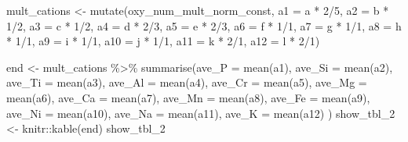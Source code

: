 \documentclass[
]{article}
\newenvironment{Shaded}{\begin{snugshade}}{\end{snugshade}}
\newcommand{\AttributeTok}[1]{\textcolor[rgb]{0.77,0.63,0.00}{#1}}
\newcommand{\DecValTok}[1]{\textcolor[rgb]{0.00,0.00,0.81}{#1}}
\newcommand{\FunctionTok}[1]{\textcolor[rgb]{0.00,0.00,0.00}{#1}}
\newcommand{\NormalTok}[1]{#1}
\newcommand{\OtherTok}[1]{\textcolor[rgb]{0.56,0.35,0.01}{#1}}
\newcommand{\SpecialCharTok}[1]{\textcolor[rgb]{0.00,0.00,0.00}{#1}}
\begin{document}
\begin{Shaded}
\begin{Highlighting}[]
\NormalTok{mult\_cations }\OtherTok{\textless{}{-}} \FunctionTok{mutate}\NormalTok{(oxy\_num\_mult\_norm\_const, }\AttributeTok{a1 =}\NormalTok{ a }\SpecialCharTok{*} \DecValTok{2}\SpecialCharTok{/}\DecValTok{5}\NormalTok{,}
                       \AttributeTok{a2 =}\NormalTok{ b }\SpecialCharTok{*} \DecValTok{1}\SpecialCharTok{/}\DecValTok{2}\NormalTok{,}
                       \AttributeTok{a3 =}\NormalTok{ c }\SpecialCharTok{*} \DecValTok{1}\SpecialCharTok{/}\DecValTok{2}\NormalTok{,}
                       \AttributeTok{a4 =}\NormalTok{ d }\SpecialCharTok{*} \DecValTok{2}\SpecialCharTok{/}\DecValTok{3}\NormalTok{,}
                       \AttributeTok{a5 =}\NormalTok{ e }\SpecialCharTok{*} \DecValTok{2}\SpecialCharTok{/}\DecValTok{3}\NormalTok{,}
                       \AttributeTok{a6 =}\NormalTok{ f }\SpecialCharTok{*} \DecValTok{1}\SpecialCharTok{/}\DecValTok{1}\NormalTok{,}
                       \AttributeTok{a7 =}\NormalTok{ g }\SpecialCharTok{*} \DecValTok{1}\SpecialCharTok{/}\DecValTok{1}\NormalTok{,}
                       \AttributeTok{a8 =}\NormalTok{ h }\SpecialCharTok{*} \DecValTok{1}\SpecialCharTok{/}\DecValTok{1}\NormalTok{,}
                       \AttributeTok{a9 =}\NormalTok{ i }\SpecialCharTok{*} \DecValTok{1}\SpecialCharTok{/}\DecValTok{1}\NormalTok{,}
                       \AttributeTok{a10 =}\NormalTok{ j }\SpecialCharTok{*} \DecValTok{1}\SpecialCharTok{/}\DecValTok{1}\NormalTok{,}
                       \AttributeTok{a11 =}\NormalTok{ k }\SpecialCharTok{*} \DecValTok{2}\SpecialCharTok{/}\DecValTok{1}\NormalTok{,}
                       \AttributeTok{a12 =}\NormalTok{ l }\SpecialCharTok{*} \DecValTok{2}\SpecialCharTok{/}\DecValTok{1}\NormalTok{)}

\NormalTok{end }\OtherTok{\textless{}{-}}\NormalTok{ mult\_cations }\SpecialCharTok{\%\textgreater{}\%} 
  \FunctionTok{summarise}\NormalTok{(}\AttributeTok{ave\_P =} \FunctionTok{mean}\NormalTok{(a1),}
            \AttributeTok{ave\_Si =} \FunctionTok{mean}\NormalTok{(a2),}
            \AttributeTok{ave\_Ti =} \FunctionTok{mean}\NormalTok{(a3),}
            \AttributeTok{ave\_Al =} \FunctionTok{mean}\NormalTok{(a4),}
            \AttributeTok{ave\_Cr =} \FunctionTok{mean}\NormalTok{(a5),}
            \AttributeTok{ave\_Mg =} \FunctionTok{mean}\NormalTok{(a6),}
            \AttributeTok{ave\_Ca =} \FunctionTok{mean}\NormalTok{(a7),}
            \AttributeTok{ave\_Mn =} \FunctionTok{mean}\NormalTok{(a8),}
            \AttributeTok{ave\_Fe =} \FunctionTok{mean}\NormalTok{(a9),}
            \AttributeTok{ave\_Ni =} \FunctionTok{mean}\NormalTok{(a10),}
            \AttributeTok{ave\_Na =} \FunctionTok{mean}\NormalTok{(a11),}
            \AttributeTok{ave\_K =} \FunctionTok{mean}\NormalTok{(a12) }
\NormalTok{            )}
\NormalTok{show\_tbl\_2 }\OtherTok{\textless{}{-}}\NormalTok{ knitr}\SpecialCharTok{::}\FunctionTok{kable}\NormalTok{(end)}
\NormalTok{show\_tbl\_2}
\end{Highlighting}
\end{Shaded}
\end{document}
